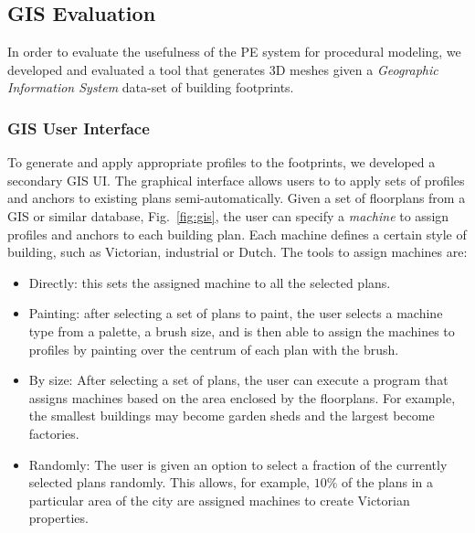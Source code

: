 \subsection{GIS Evaluation}
\label{Sec:GIS_Eval}

In order to evaluate the usefulness of the PE system for procedural modeling, we developed and evaluated a tool that generates 3D meshes given a  \emph{Geographic Information System} data-set of building footprints. 

\subsubsection{GIS User Interface}

To generate and apply appropriate profiles to the footprints, we developed a secondary GIS UI. The graphical interface allows users to to apply sets of profiles and anchors to existing plans semi-automatically. Given a set of floorplans from a GIS or similar database, Fig.~\ref{fig:gis}, the user can specify a \emph{machine} to assign profiles and anchors to each building plan. Each machine defines a certain style of building, such as Victorian, industrial or Dutch. The tools to assign machines are:

\begin{itemize}
\item{Directly: this sets the assigned machine to all the selected plans.}
\item{Painting: after selecting a set of plans to paint, the user selects a machine type from a palette, a brush size, and is then able to assign the machines to profiles by painting over the centrum of each plan with the brush.}
\item{By size: After selecting a set of plans, the user can execute a program that assigns machines based on the area enclosed by the floorplans. For example, the smallest buildings may become garden sheds and the largest become factories.}
\item{Randomly: The user is given an option to select a fraction of the currently selected plans randomly. This allows, for example, $10\%$ of the plans in a particular area of the city are assigned machines to create Victorian properties.}
\end{itemize}


